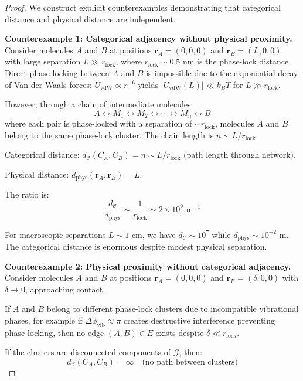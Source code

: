 \documentclass[12pt,a4paper]{article}
\theoremstyle{definition}
\theoremstyle{remark}
\newcommand{\phaselockgraph}{\mathcal{G}}
\newcommand{\catspace}{\mathcal{C}}
\begin{document}
\begin{proof}
We construct explicit counterexamples demonstrating that categorical distance and physical distance are independent.

\textbf{Counterexample 1: Categorical adjacency without physical proximity.}
Consider molecules $A$ and $B$ at positions $\mathbf{r}_A = (0, 0, 0)$ and $\mathbf{r}_B = (L, 0, 0)$ with large separation $L \gg r_{\text{lock}}$, where $r_{\text{lock}} \sim 0.5$ nm is the phase-lock distance. Direct phase-locking between $A$ and $B$ is impossible due to the exponential decay of Van der Waals forces: $U_{\text{vdW}} \propto r^{-6}$ yields $|U_{\text{vdW}}(L)| \ll k_B T$ for $L \gg r_{\text{lock}}$.

However, through a chain of intermediate molecules:
\begin{equation}
A \leftrightarrow M_1 \leftrightarrow M_2 \leftrightarrow \cdots \leftrightarrow M_n \leftrightarrow B
\end{equation}
where each pair is phase-locked with a separation of $\sim r_{\text{lock}}$, molecules $A$ and $B$ belong to the same phase-lock cluster. The chain length is $n \sim L/r_{\text{lock}}$.

Categorical distance: $d_{\catspace}(C_A, C_B) = n \sim L/r_{\text{lock}}$ (path length through network).

Physical distance: $d_{\text{phys}}(\mathbf{r}_A, \mathbf{r}_B) = L$.

The ratio is:
\begin{equation}
\frac{d_{\catspace}}{d_{\text{phys}}} \sim \frac{1}{r_{\text{lock}}} \sim 2 \times 10^9 \text{ m}^{-1}
\end{equation}

For macroscopic separations $L \sim 1$ cm, we have $d_{\catspace} \sim 10^7$ while $d_{\text{phys}} \sim 10^{-2}$ m. The categorical distance is enormous despite modest physical separation.

\textbf{Counterexample 2: Physical proximity without categorical adjacency.}
Consider molecules $A$ and $B$ at positions $\mathbf{r}_A = (0, 0, 0)$ and $\mathbf{r}_B = (\delta, 0, 0)$ with $\delta \to 0$, approaching contact.

If $A$ and $B$ belong to different phase-lock clusters due to incompatible vibrational phases, for example if $\Delta\phi_{\text{vib}} \approx \pi$ creates destructive interference preventing phase-locking, then no edge $(A, B) \in E$ exists despite $\delta \ll r_{\text{lock}}$.

If the clusters are disconnected components of $\phaselockgraph$, then:
\begin{equation}
d_{\catspace}(C_A, C_B) = \infty \quad \text{(no path between clusters)}
\end{equation}


\end{proof}
\end{document}
